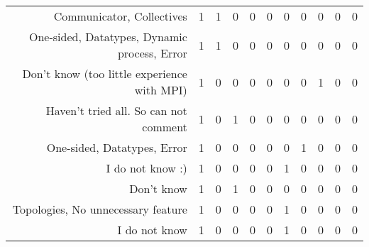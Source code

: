 {\begin{landscape}
\begin{longtable}[htb]{r|c|c|c|c|c|c|c|c|c|c}
{Communicator, Collectives} & 1 & 1 & 0 & 0 & 0 & 0 & 0 & 0 & 0 & 0 \\%
{One-sided, Datatypes, Dynamic process, Error} & 1 & 1 & 0 & 0 & 0 & 0 & 0 & 0 & 0 & 0 \\%
{Don't know (too little experience with MPI)} & 1 & 0 & 0 & 0 & 0 & 0 & 0 & 1 & 0 & 0 \\%
{Haven't tried all. So can not comment} & 1 & 0 & 1 & 0 & 0 & 0 & 0 & 0 & 0 & 0 \\%
{One-sided, Datatypes, Error} & 1 & 0 & 0 & 0 & 0 & 0 & 1 & 0 & 0 & 0 \\%
{I do not know :)} & 1 & 0 & 0 & 0 & 0 & 1 & 0 & 0 & 0 & 0 \\%
{Don't know} & 1 & 0 & 1 & 0 & 0 & 0 & 0 & 0 & 0 & 0 \\%
{Topologies, No unnecessary feature} & 1 & 0 & 0 & 0 & 0 & 1 & 0 & 0 & 0 & 0 \\%
{I do not know} & 1 & 0 & 0 & 0 & 0 & 1 & 0 & 0 & 0 & 0 \\%
\hline%
\end{longtable}%
\end{landscape}}%
\clearpage%
